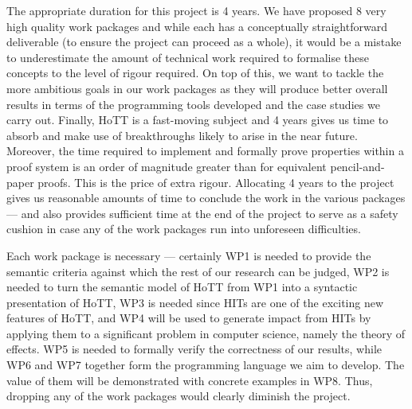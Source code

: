\documentclass[a4paper,11pt]{article}
\begin{document}
\vspace{0.02in}

 The appropriate duration for
this project is 4 years. We have proposed 8 very high quality work
packages and while each has a conceptually straightforward deliverable
(to ensure the project can proceed as a whole), it would be a mistake
to underestimate the amount of technical work required to formalise these
concepts to the level of rigour required. On top of this,
we want to tackle the more ambitious goals in our work packages as
they will produce better overall results in terms of the programming
tools developed and the case studies we carry out. Finally,
HoTT is a fast-moving subject and 4 years gives us time to absorb and
make use of breakthroughs likely to arise in the near future.
Moreover, the time required to implement and formally prove properties
within a proof system is an order of magnitude greater than for
equivalent pencil-and-paper proofs. This is the price of extra
rigour. Allocating 4 years to the project gives us reasonable amounts
of time to conclude the work in the various packages
--- and also
provides sufficient time at the end of the project to serve as a
safety cushion in case any of the work packages run into unforeseen
difficulties.

\noindent Each work package is necessary --- certainly WP1 is needed
to provide the semantic criteria against which the 
rest of our research can be judged, WP2 is needed to turn the semantic
model of HoTT from WP1 into a syntactic presentation of HoTT, WP3 is
needed since HITs are one of the exciting new features of HoTT, and
WP4 will be used to generate impact from HITs by applying them to a
significant problem in computer science, namely the theory of
effects. WP5 is needed to formally verify the correctness of our results, while WP6 and WP7 together form the programming language
we aim to develop. The value of them will be demonstrated with
concrete examples in WP8.  Thus, dropping any of the work packages
would clearly diminish the project.

\vspace{0.02in}
\end{document}
